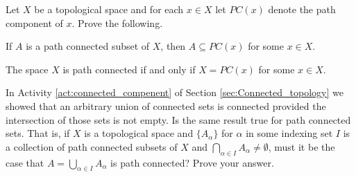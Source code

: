 
\be

\item Let $X$ be a topological space and for each $x \in X$ let $PC(x)$ denote the path component of $x$. Prove the following.

\ba

\item If $A$ is a path connected subset of $X$, then $A \subseteq PC(x)$ for some $x \in X$.

\item The space $X$ is path connected if and only if $X = PC(x)$ for some $x \in X$.

\ea

\begin{comment}

\ExerciseSolution

\ba

\item Let $A$ be a path connected subset of $X$, and let $x \in A$. Since $PC(x)$ is the largest path connected subset of $X$ that contains $x$, it follows that $A \subseteq PC(x)$.

\item Suppose that $X$ is path connected. Then $X$ is a path connected subset of $X$, so part (a) shows that $X = PC(x)$ for some $x \in X$. Conversely, if $X = PC(x)$ for some $x \in X$, then $X$ is path connected since $PC(x)$ is path connected.

\ea


\end{comment}

\item In Activity \ref{act:connected_compenent} of Section \ref{sec:Connected_topology} we showed that an arbitrary union of connected sets is connected provided the intersection of those sets is not empty. Is the same result true for path connected sets. That is, if $X$ is a topological space and $\{A_{\alpha}\}$ for $\alpha$ in some indexing set $I$ is a collection of path connected subsets of $X$ and $\bigcap_{\alpha \in I} A_{\alpha} \neq \emptyset$, must it be the case that $A = \bigcup_{\alpha \in I} A_{\alpha}$ is path connected? Prove your answer. 


